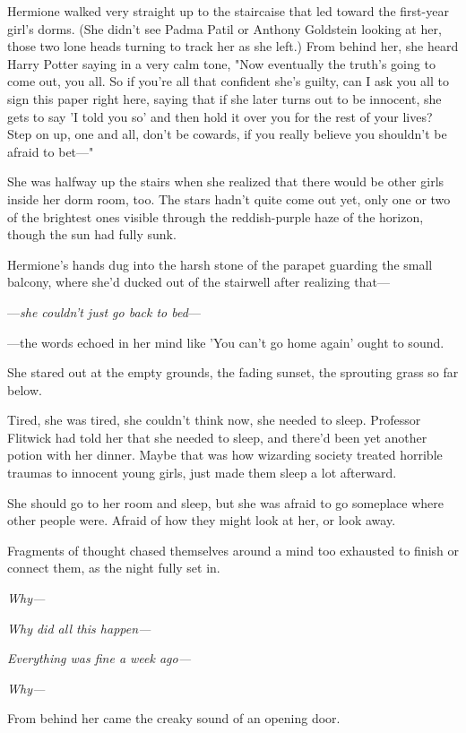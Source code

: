 Hermione walked very straight up to the staircaise that led toward the 
first-year girl's dorms. (She didn't see Padma Patil or Anthony Goldstein 
looking at her, those two lone heads turning to track her as she left.) From 
behind her, she heard Harry Potter saying in a very calm tone, "Now eventually 
the truth's going to come out, you all. So if you're all that confident she's 
guilty, can I ask you all to sign this paper right here, saying that if she 
later turns out to be innocent, she gets to say 'I told you so' and then hold 
it over you for the rest of your lives? Step on up, one and all, don't be 
cowards, if you really believe you shouldn't be afraid to bet---"

She was halfway up the stairs when she realized that there would be other girls 
inside her dorm room, too.
\sbreak
The stars hadn't quite come out yet, only one or two of the brightest ones 
visible through the reddish-purple haze of the horizon, though the sun had 
fully sunk.

Hermione's hands dug into the harsh stone of the parapet guarding the small 
balcony, where she'd ducked out of the stairwell after realizing that---

---\emph{she couldn't just go back to bed}---

---the words echoed in her mind like 'You can't go home again' ought to sound.

She stared out at the empty grounds, the fading sunset, the sprouting grass so 
far below.

Tired, she was tired, she couldn't think now, she needed to sleep. Professor 
Flitwick had told her that she needed to sleep, and there'd been yet another 
potion with her dinner. Maybe that was how wizarding society treated horrible 
traumas to innocent young girls, just made them sleep a lot afterward.

She should go to her room and sleep, but she was afraid to go someplace where 
other people were. Afraid of how they might look at her, or look away.

Fragments of thought chased themselves around a mind too exhausted to finish or 
connect them, as the night fully set in.

\emph{Why---}

\emph{Why did all this happen---}

\emph{Everything was fine a week ago---}

\emph{Why---}

From behind her came the creaky sound of an opening door.

